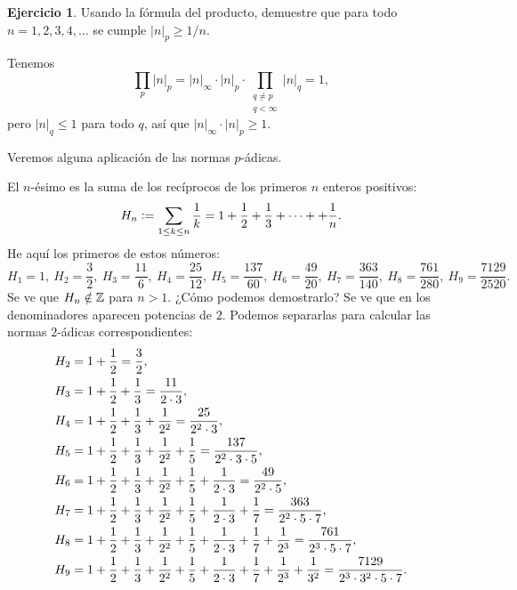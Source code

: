 \documentclass{article}
\numberwithin{equation}{section}
\theoremstyle{definition}
\newtheorem{ejerc}{Ejercicio}
\begin{document}
\begin{ejerc}
  Usando la fórmula del producto, demuestre que para todo
  $n = 1, 2, 3, 4, \ldots$ se cumple $|n|_p \ge 1/n$.

  \ifdefined\solutions\begin{solucion}
    Tenemos
    \[ \prod_p |n|_p =
       |n|_\infty \cdot |n|_p \cdot
       \prod_{\substack{q\ne p \\ q < \infty}} |n|_q = 1, \]
    pero $|n|_q \le 1$ para todo $q$, así que $|n|_\infty \cdot |n|_p \ge 1$.
  \end{solucion}\fi
\end{ejerc}

Veremos alguna aplicación de las normas $p$-ádicas.

\begin{aplicacion}
  El $n$-ésimo  es la suma de los recíprocos de los
  primeros $n$ enteros positivos:
  \[ H_n \mathrel{\mathop:}= \sum_{1 \le k \le n} \frac{1}{k} =
     1 + \frac{1}{2} + \frac{1}{3} + \cdots +  + \frac{1}{n}. \]
  He aquí los primeros de estos números:
  \[ H_1 = 1, ~
     H_2 = \frac{3}{2}, ~
     H_3 = \frac{11}{6}, ~
     H_4 = \frac{25}{12}, ~
     H_5 = \frac{137}{60}, ~
     H_6 = \frac{49}{20}, ~
     H_7 = \frac{363}{140}, ~
     H_8 = \frac{761}{280}, ~
     H_9 = \frac{7129}{2520}. \]
  Se ve que $H_n \notin \mathbb{Z}$ para $n > 1$. ¿Cómo podemos demostrarlo? Se ve que
  en los denominadores aparecen potencias de $2$. Podemos separarlas para
  calcular las normas $2$-ádicas correspondientes:
  \begin{align}
    \notag H_2 & = 1 + \frac{1}{2} = \frac{3}{2},\\
    \notag H_3 & = 1 + \frac{1}{2} + \frac{1}{3} = \frac{11}{2\cdot 3},\\
    \notag H_4 & = 1 + \frac{1}{2} + \frac{1}{3} + \frac{1}{2^2} = \frac{25}{2^2\cdot 3},\\
    \notag H_5 & = 1 + \frac{1}{2} + \frac{1}{3} + \frac{1}{2^2} + \frac{1}{5} = \frac{137}{2^2\cdot 3\cdot 5},\\
    \label{eqn:suma-H-6} H_6 & = 1 + \frac{1}{2} + \frac{1}{3} + \frac{1}{2^2} + \frac{1}{5} + \frac{1}{2\cdot 3} = \frac{49}{2^2\cdot 5},\\
    \notag H_7 & = 1 + \frac{1}{2} + \frac{1}{3} + \frac{1}{2^2} + \frac{1}{5} + \frac{1}{2\cdot 3} + \frac{1}{7} = \frac{363}{2^2\cdot 5\cdot 7},\\
    \notag H_8 & = 1 + \frac{1}{2} + \frac{1}{3} + \frac{1}{2^2} + \frac{1}{5} + \frac{1}{2\cdot 3} + \frac{1}{7} + \frac{1}{2^3} = \frac{761}{2^3\cdot 5\cdot 7},\\
    \notag H_9 & = 1 + \frac{1}{2} + \frac{1}{3} + \frac{1}{2^2} + \frac{1}{5} + \frac{1}{2\cdot 3} + \frac{1}{7} + \frac{1}{2^3} + \frac{1}{3^2} = \frac{7129}{2^3\cdot 3^2\cdot 5\cdot 7}.
  \end{align}


\end{aplicacion}
\end{document}

